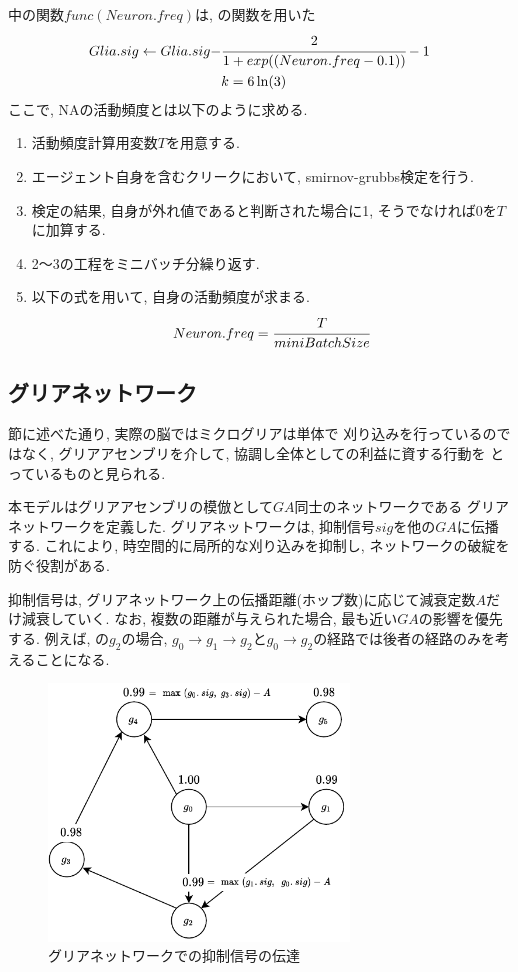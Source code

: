 \documentclass[a4paper,10.5pt,twocolumn]{jsarticle}
\begin{document}
中の関数$func(Neuron.freq)$は, の関数を用いた
\begin{align}
  Glia.sig\leftarrow Glia.sig-&\displaystyle \cfrac{2}{1+exp((Neuron.freq-0.1))}-1\\
  &k=6\ln(3)
  \label{eq:new}
\end{align}
ここで, NAの活動頻度とは以下のように求める.
\begin{enumerate}
  \item 活動頻度計算用変数$T$を用意する.
  \item エージェント自身を含むクリークにおいて, 
  smirnov-grubbs検定を行う.
  \item 検定の結果, 自身が外れ値であると判断された場合に1, そうでなければ0を$T$に加算する.
  \item 2〜3の工程をミニバッチ分繰り返す.
  \item 以下の式を用いて, 自身の活動頻度が求まる.
  \vspace{-2zh}
  \begin{align}
    Neuron.freq=\cfrac{T}{miniBatchSize}
  \end{align}
\end{enumerate} 
\subsection{グリアネットワーク}
節に述べた通り, 実際の脳ではミクログリアは単体で
刈り込みを行っているのではなく, 
グリアアセンブリを介して, 協調し全体としての利益に資する行動を
とっているものと見られる.

本モデルはグリアアセンブリの模倣として$GA$同士のネットワークである
グリアネットワークを定義した.
グリアネットワークは, 抑制信号$sig$を他の$GA$に伝播する.
これにより, 時空間的に局所的な刈り込みを抑制し, ネットワークの破綻を防ぐ役割がある.

抑制信号は, グリアネットワーク上の伝播距離(ホップ数)に応じて減衰定数$A$だけ減衰していく.
なお, 複数の距離が与えられた場合, 最も近い$GA$の影響を優先する.
例えば, の$g_2$の場合, 
$g_0\rightarrow g_1\rightarrow g_2$と$g_0\rightarrow g_2$の経路では後者の経路のみを考えることになる.
\vspace{-3zh}
\begin{figure}[H]
  \centering
  \includegraphics[width=8cm]{GliaNetworks.pdf}
  \caption{グリアネットワークでの抑制信号の伝達}
  \label{fig:GliaNetworks}
\end{figure}
\vspace{-2zh}
\end{document}
